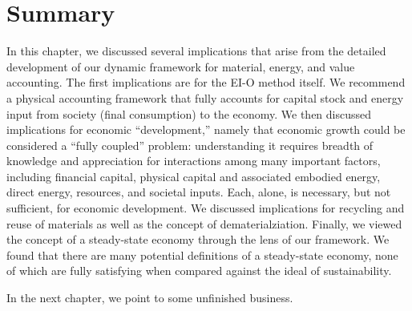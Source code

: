%


\section{Summary}
\label{sec:summary_implications}

In this chapter, we discussed several implications that arise from 
the detailed development of our dynamic framework for material,
energy, and value accounting.
The first implications are for the EI-O method itself. 
We recommend a physical accounting framework that fully
accounts for capital stock and energy input from society (final consumption)
to the economy.
We then discussed implications for economic ``development,''
namely that economic growth could be considered a ``fully coupled'' problem: 
understanding it requires breadth of knowledge 
and appreciation for interactions among many important factors,
including financial capital, physical capital and associated embodied energy,
direct energy, resources, and societal inputs.
Each, alone, is necessary, but not sufficient, for economic development.
We discussed implications for recycling and reuse of materials
as well as the concept of dematerialziation.
Finally, we viewed the concept of a steady-state economy through
the lens of our framework.
We found that there are many potential definitions of a steady-state economy,
none of which are fully satisfying when compared against the ideal 
of sustainability.

In the next chapter, we point to some unfinished business.






